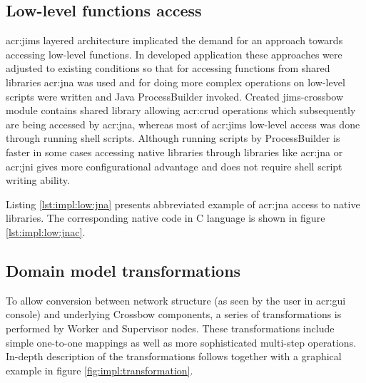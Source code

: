 \documentclass[11pt]{book}
\begin{document}
      \subsection{Low-level functions access}
      \label{sec:impl:low}

        \gls{acr:jims} layered architecture implicated the demand for an approach towards accessing low-level functions.
        In developed application these approaches were adjusted to existing conditions so that for accessing functions
        from shared libraries \gls{acr:jna} was used and for doing more complex operations on low-level scripts were
        written and Java ProcessBuilder invoked. Created jims-crossbow module contains shared library allowing
        \gls{acr:crud} operations which subsequently are being accessed by \gls{acr:jna}, whereas most of \gls{acr:jims}
        low-level access was done through running shell scripts. Although running scripts by ProcessBuilder is faster in
        some cases accessing native libraries through libraries like \gls{acr:jna} or \gls{acr:jni} gives more
        configurational advantage and does not require shell script writing ability.

        Listing \ref{lst:impl:low:jna} presents abbreviated example of \gls{acr:jna} access to native libraries. The
        corresponding native code in C language is shown in figure \ref{lst:impl:low:jnac}. \\


        \noindent
          \begin{minipage}{\textwidth}
          
        \end{minipage}  

        \noindent
        \begin{minipage}{\textwidth}
          
        \end{minipage}


      \subsection{Domain model transformations}
      \label{sec:impl:model}

        To allow conversion between network structure (as seen by the user in \gls{acr:gui} console) and underlying
        Crossbow components, a series of transformations is performed by Worker and Supervisor nodes. These
        transformations include simple one-to-one mappings as well as more sophisticated multi-step operations.
        In-depth description of the transformations follows together with a graphical example in figure
        \ref{fig:impl:transformation}.
\end{document}
